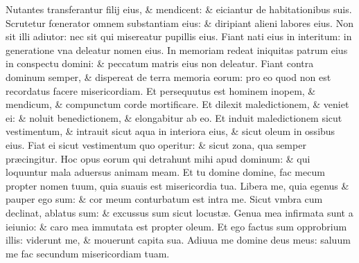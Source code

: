 \documentclass[a5paper,10pt]{book}
\def\ae{æ}
\def\oe{œ}
\begin{document}
\begin{multicols*}{2}
\newline \color{red} N\color{black}utantes transferantur filij eius, \& mendicent: \& eiciantur de habitationibus suis.
\newline \color{red} S\color{black}crutetur f\oe nerator omnem substantiam eius: \& diripiant alieni labores eius.
\newline \color{red} N\color{black}on sit illi adiutor: nec sit qui misereatur pupillis eius.
\newline \color{red} F\color{black}iant nati eius in interitum: in generatione vna deleatur nomen eius.
\newline \color{red} I\color{black}n memoriam redeat iniquitas patrum eius in conspectu domini: \& peccatum matris eius non deleatur.
\newline \color{red} F\color{black}iant contra dominum semper, \& dispereat de terra memoria eorum: pro eo quod non est recordatus facere misericordiam.
\newline \color{red} E\color{black}t persequutus est hominem inopem, \& mendicum, \& compunctum corde mortificare.
\newline \color{red} E\color{black}t dilexit maledictionem, \& veniet ei: \& noluit benedictionem, \& elongabitur ab eo.
\newline \color{red} E\color{black}t induit maledictionem sicut vestimentum, \& intrauit sicut aqua in interiora eius, \& sicut oleum in ossibus eius.
\newline \color{red} F\color{black}iat ei sicut vestimentum quo operitur: \& sicut zona, qua semper pr\ae cingitur.
\newline \color{red} H\color{black}oc opus eorum qui detrahunt mihi apud dominum: \& qui loquuntur mala aduersus animam meam.
\newline \color{red} E\color{black}t tu domine domine, fac mecum propter nomen tuum, quia suauis est misericordia tua.
\newline \color{red} L\color{black}ibera me, quia egenus \& pauper ego sum: \& cor meum conturbatum est intra me.
\newline \color{red} S\color{black}icut vmbra cum declinat, ablatus sum: \& excussus sum sicut locust\ae .
\newline \color{red} G\color{black}enua mea infirmata sunt a ieiunio: \& caro mea immutata est propter oleum.
\newline \color{red} E\color{black}t ego factus sum opprobrium illis: viderunt me, \& mouerunt capita sua.
\newline \color{red} A\color{black}diuua me domine deus meus: saluum me fac secundum misericordiam tuam.

\end{multicols*}
\end{document}

